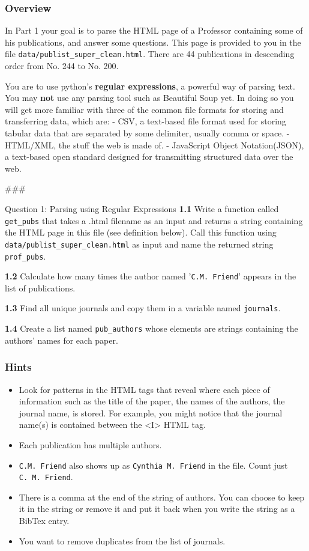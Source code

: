 \documentclass[11pt]{article}
\providecommand{\tightlist}{%
      \setlength{\itemsep}{0pt}\setlength{\parskip}{0pt}}
\begin{document}
\subsubsection{Overview}\label{overview}

In Part 1 your goal is to parse the HTML page of a Professor containing
some of his publications, and answer some questions. This page is
provided to you in the file \texttt{data/publist\_super\_clean.html}.
There are 44 publications in descending order from No. 244 to No. 200.

You are to use python's \textbf{regular expressions}, a powerful way of
parsing text. You may \textbf{not} use any parsing tool such as
Beautiful Soup yet. In doing so you will get more familiar with three of
the common file formats for storing and transferring data, which are: -
CSV, a text-based file format used for storing tabular data that are
separated by some delimiter, usually comma or space. - HTML/XML, the
stuff the web is made of. - JavaScript Object Notation(JSON), a
text-based open standard designed for transmitting structured data over
the web.

\#\#\#

Question 1: Parsing using Regular Expressions \textbf{1.1} Write a
function called \texttt{get\_pubs} that takes a .html filename as an
input and returns a string containing the HTML page in this file (see
definition below). Call this function using
\texttt{data/publist\_super\_clean.html} as input and name the returned
string \texttt{prof\_pubs}.

\textbf{1.2} Calculate how many times the author named
'\texttt{C.M.\ Friend}' appears in the list of publications.

\textbf{1.3} Find all unique journals and copy them in a variable named
\texttt{journals}.

\textbf{1.4} Create a list named \texttt{pub\_authors} whose elements
are strings containing the authors' names for each paper.

\subsubsection{Hints}\label{hints}

\begin{itemize}
\tightlist
\item
  Look for patterns in the HTML tags that reveal where each piece of
  information such as the title of the paper, the names of the authors,
  the journal name, is stored. For example, you might notice that the
  journal name(s) is contained between the \textless{}I\textgreater{}
  HTML tag.
\item
  Each publication has multiple authors.
\item
  \texttt{C.M.\ Friend} also shows up as \texttt{Cynthia\ M.\ Friend} in
  the file. Count just \texttt{C.\ M.\ Friend}.
\item
  There is a comma at the end of the string of authors. You can choose
  to keep it in the string or remove it and put it back when you write
  the string as a BibTex entry.
\item
  You want to remove duplicates from the list of journals.
\end{itemize}
\end{document}
